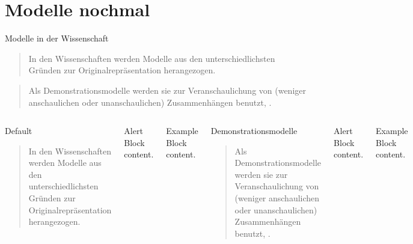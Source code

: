 \section{Modelle nochmal}
\begin{frame}{Modelle in der Wissenschaft}
    \begin{quote}
        In den Wissenschaften werden Modelle aus den unterschiedlichsten Gründen zur Originalrepräsentation herangezogen.~\parencite[138]{stachowiak}
    \end{quote}
    \begin{quote}
        Als Demonstrationsmodelle werden sie zur
Veranschaulichung von (weniger anschaulichen oder
unanschaulichen) Zusammenhängen benutzt, \punkti.~\parencite[138]{stachowiak}
    \end{quote}
  \begin{columns}[T,onlytextwidth]
      \begin{block}{Default}
            \begin{quote}
        In den Wissenschaften werden Modelle aus den unterschiedlichsten Gründen zur Originalrepräsentation herangezogen.~\parencite[138]{stachowiak}
    \end{quote}
      \end{block}

      \begin{alertblock}{Alert}
        Block content.
      \end{alertblock}

      \begin{exampleblock}{Example}
        Block content.
      \end{exampleblock}



      \begin{block}{Demonstrationsmodelle}
            \begin{quote}
        Als Demonstrationsmodelle werden sie zur
Veranschaulichung von (weniger anschaulichen oder
unanschaulichen) Zusammenhängen benutzt, \punkti.~\parencite[138]{stachowiak}
    \end{quote}
      \end{block}

      \begin{alertblock}{Alert}
        Block content.
      \end{alertblock}

      \begin{exampleblock}{Example}
        Block content.
      \end{exampleblock}

  \end{columns}
\end{frame}



